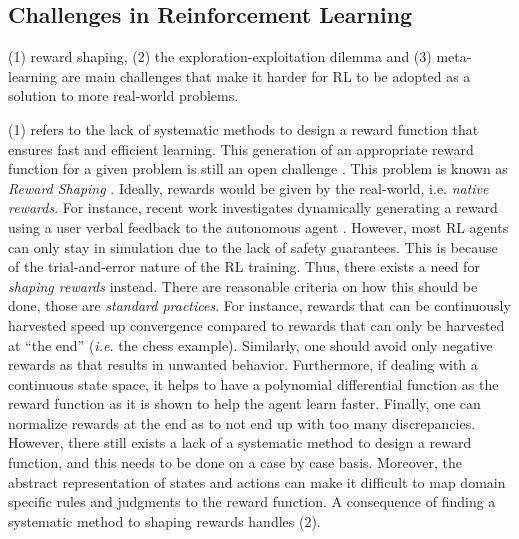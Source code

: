 \documentclass[a4paper,11pt]{article}
\theoremstyle{definition}
\begin{document}
\subsection{Challenges in Reinforcement Learning}
\label{sec:challenges}
(1) reward shaping, (2) the exploration-exploitation dilemma and (3) meta-learning are main challenges
that make it harder for RL to be adopted as a solution to more real-world problems. 

\medskip 

(1) refers to the lack of systematic methods to design a reward
  function that ensures fast and efficient learning. This generation of an appropriate 
reward function for a given problem is still an open challenge \cite{kober2013}. This problem is known as \textit{Reward Shaping} \cite{laud2011}.  
Ideally, rewards would be given by the real-world, i.e. \textit{native rewards}. For instance, recent work investigates dynamically generating a reward 
using a user verbal feedback to the autonomous agent \cite{gonzalez2010}. However, most RL agents 
can only stay in simulation due to the lack of safety guarantees. This is because of the trial-and-error nature of the RL training. 
Thus, there exists a need for \textit{shaping rewards} instead. There are reasonable criteria on how this should be done, those are \emph{standard practices}. For instance, 
rewards that can be continuously harvested speed up convergence
compared to rewards that can only be harvested at ``the end''
(\emph{i.e.} the chess example). Similarly, one should avoid only 
negative rewards as that results in unwanted behavior. Furthermore, if dealing with a continuous state space, it helps to have a polynomial differential function as the reward function 
as it is shown to help the agent learn faster. Finally, one can normalize rewards at the end as to not end up with too many discrepancies. 
However, there still exists a lack of a systematic method to design a
reward function, and this needs to be done on a case by case basis.
%
Moreover, the abstract representation of states and actions can make
it difficult to map domain specific rules and judgments to the reward
function. A consequence of finding a systematic method to shaping rewards handles (2).

\medskip
\end{document}
